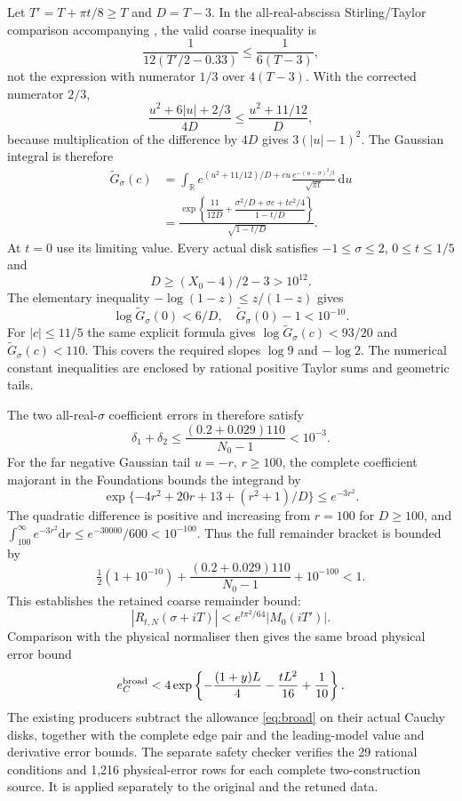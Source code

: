 \documentclass[11pt,a4paper]{article}
\theoremstyle{definition}\newtheorem{definition}[theorem]{Definition}
\theoremstyle{remark}\newtheorem{remark}[theorem]{Remark}
\newcommand{\dd}{\mathrm d}
\begin{document}
Let $T'=T+\pi t/8\ge T$ and $D=T-3$. In the all-real-abscissa
Stirling/Taylor comparison accompanying \cite[(62)]{polymath}, the valid
coarse inequality is
\[
\frac1{12(T'/2-0.33)}\le\frac1{6(T-3)},
\]
not the expression with numerator $1/3$ over $4(T-3)$. With the corrected
numerator $2/3$,
\[
\frac{u^2+6|u|+2/3}{4D}\le\frac{u^2+11/12}{D},
\]
because multiplication of the difference by $4D$ gives
$3(|u|-1)^2$. The Gaussian integral is therefore
\begin{align}\label{eq:Gaussian}
\widetilde G_\sigma(c)
&=\int_{\mathbb R}e^{(u^2+11/12)/D+cu}
\frac{e^{-(u-\sigma)^2/t}}{\sqrt{\pi t}}\,\dd u\nonumber\\
&=\frac{\exp\left\{\dfrac{11}{12D}+
\dfrac{\sigma^2/D+\sigma c+tc^2/4}{1-t/D}\right\}}
{\sqrt{1-t/D}}.
\end{align}
At $t=0$ use its limiting value. Every actual disk satisfies
$-1\le\sigma\le2$, $0\le t\le1/5$ and
\[
D\ge(X_0-4)/2-3>10^{12}.
\]
The elementary inequality $-\log(1-z)\le z/(1-z)$ gives
\[
\log\widetilde G_\sigma(0)<6/D,
\quad\widetilde G_\sigma(0)-1<10^{-10}.
\]
For $|c|\le11/5$ the same explicit formula gives
$\log\widetilde G_\sigma(c)<93/20$ and
$\widetilde G_\sigma(c)<110$. This covers the required slopes
$\log9$ and $-\log2$. The numerical constant inequalities are enclosed
by rational positive Taylor sums and geometric tails.

The two all-real-$\sigma$ coefficient errors in
\cite[(62)--(64)]{polymath} therefore satisfy
\[
\delta_1+\delta_2
\le\frac{(0.2+0.029)110}{N_0-1}<10^{-3}.
\]
For the far negative Gaussian tail $u=-r$, $r\ge100$, the complete
coefficient majorant in the Foundations bounds the integrand by
\[
\exp\{-4r^2+20r+13+(r^2+1)/D\}\le e^{-3r^2}.
\]
The quadratic difference is positive and increasing from $r=100$ for
$D\ge100$, and
$\int_{100}^\infty e^{-3r^2}\dd r\le e^{-30000}/600<10^{-100}$.
Thus the full remainder bracket is bounded by
\[
\tfrac12(1+10^{-10})+
\frac{(0.2+0.029)110}{N_0-1}+10^{-100}<1.
\]
This establishes the retained coarse remainder bound:
\[
|R_{t,N}(\sigma+iT)|<e^{t\pi^2/64}|M_0(iT')|.
\]
Comparison with the physical normaliser then gives the same broad
physical error bound
\begin{equation}\label{eq:broad}
e_C^{\rm broad}
<4\exp\left\{-\frac{(1+y)L}{4}-\frac{tL^2}{16}+\frac1{10}\right\}.
\end{equation}
The existing producers subtract the allowance \eqref{eq:broad} on their
actual Cauchy disks, together with the complete edge pair and the
leading-model value and derivative error bounds. The separate safety checker verifies the 29 rational conditions and
1,216 physical-error rows for each complete two-construction source.
It is applied separately to the original and the retuned data.
\end{document}
